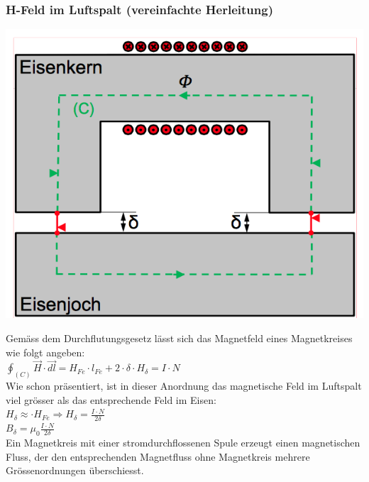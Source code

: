 \subsubsection{H-Feld im Luftspalt (vereinfachte Herleitung)}
\begin{minipage}{0.4 \linewidth}
\includegraphics[width = \linewidth]{./Pics/VL2/magKreis}
\end{minipage}
\begin{minipage}{0.6 \linewidth}
Gemäss dem Durchflutungsgesetz lässt sich das Magnetfeld eines Magnetkreises wie folgt angeben: \\

$\oint_{(C)} \vec{H} \cdot \vec{dl} = H_{Fe} \cdot l_{Fe} + 2 \cdot \delta \cdot H_{\delta}  = I \cdot N $ \\

Wie schon präsentiert, ist in dieser Anordnung das magnetische Feld im Luftspalt viel grösser als das entsprechende Feld im Eisen: \\

$H_{\delta} \approx \cdot H_{Fe} \Rightarrow H_{\delta} = \frac{I \cdot N}{2 \delta} $ \\

$B_{\delta} = \mu_0 \frac{I \cdot N}{2 \delta} $ \\

Ein Magnetkreis mit einer stromdurchflossenen Spule erzeugt einen magnetischen Fluss, der den entsprechenden Magnetfluss ohne Magnetkreis mehrere Grössenordnungen überschiesst. 
\end{minipage}

